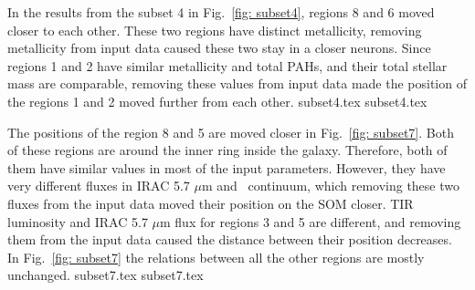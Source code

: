 {        In the results from the subset 4 in Fig.~\ref{fig: subset4}, regions 8 and 6 moved closer to each other. 
        These two regions have distinct metallicity, removing metallicity from input data caused these two stay in a closer neurons. 
        Since regions 1 and 2 have similar metallicity and total PAHs, and their total stellar mass are comparable, removing these values from input data made the position of the regions 1 and 2 moved further from each other. 
        {subset4.tex}
        {subset4.tex}
        
        The positions of the region 8 and 5 are moved closer in Fig.~\ref{fig: subset7}.
        Both of these regions are around the inner ring inside the galaxy.
        Therefore, both of them have similar values in most of the input parameters.
        However, they have very different fluxes in IRAC 5.7 $\mu$m and \sii~continuum, which removing these two fluxes from the input data moved their position on the SOM closer.
        TIR luminosity and IRAC 5.7 $\mu$m flux for regions 3 and 5 are different, and removing them from the input data caused the distance between their position decreases. 
        In Fig.~\ref{fig: subset7} the relations between all the other regions are mostly unchanged.
        {subset7.tex}
        {subset7.tex}
        }